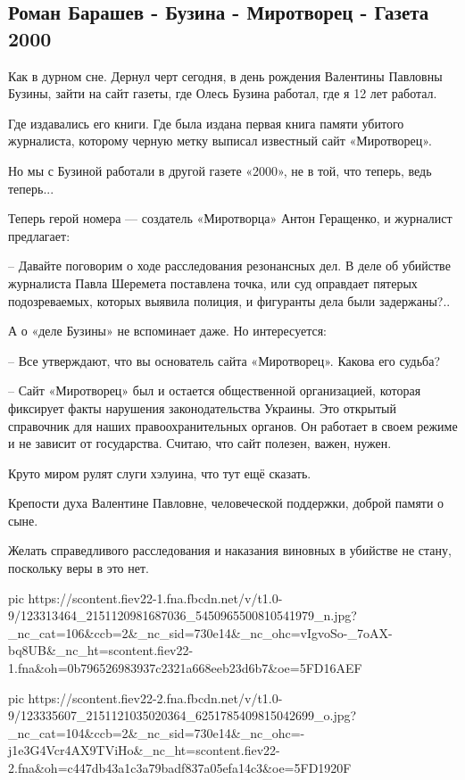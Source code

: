  
 
 

\subsection{Роман Барашев - Бузина - Миротворец - Газета 2000}
\label{sec:01_11_2020.fb.roman_barashev.1.buzina}

Как в дурном сне. Дернул черт сегодня, в день рождения Валентины Павловны
Бузины, зайти на сайт газеты, где Олесь Бузина работал, где я 12 лет работал.

Где издавались его книги. Где была издана первая книга памяти убитого
журналиста, которому черную метку выписал известный сайт «Миротворец».

Но мы с Бузиной работали в другой газете «2000», не в той, что теперь, ведь теперь... 

Теперь герой номера --- создатель «Миротворца» Антон Геращенко, и журналист предлагает:

– Давайте поговорим о ходе расследования резонансных дел. В деле об убийстве
журналиста Павла Шеремета поставлена точка, или суд оправдает пятерых
подозреваемых, которых выявила полиция, и фигуранты дела были задержаны?..

А о «деле Бузины» не вспоминает даже. Но интересуется:

– Все утверждают, что вы основатель сайта «Миротворец». Какова его судьба?

– Сайт «Миротворец» был и остается общественной организацией, которая фиксирует
факты нарушения законодательства Украины. Это открытый справочник для наших
правоохранительных органов. Он работает в своем режиме и не зависит от
государства. Считаю, что сайт полезен, важен, нужен.

Круто миром рулят слуги хэлуина, что тут ещё сказать.

Крепости духа Валентине Павловне, человеческой поддержки, доброй памяти о сыне.

Желать справедливого расследования и наказания виновных в убийстве не стану,
поскольку веры в это нет.

\ifcmt
pic https://scontent.fiev22-1.fna.fbcdn.net/v/t1.0-9/123313464_2151120981687036_5450965500810541979_n.jpg?_nc_cat=106&ccb=2&_nc_sid=730e14&_nc_ohc=vIgvoSo-_7oAX-bq8UB&_nc_ht=scontent.fiev22-1.fna&oh=0b796526983937c2321a668eeb23d6b7&oe=5FD16AEF

pic https://scontent.fiev22-2.fna.fbcdn.net/v/t1.0-9/123335607_2151121035020364_6251785409815042699_o.jpg?_nc_cat=104&ccb=2&_nc_sid=730e14&_nc_ohc=-j1e3G4Vcr4AX9TViHo&_nc_ht=scontent.fiev22-2.fna&oh=c447db43a1c3a79badf837a05efa14c3&oe=5FD1920F
\fi
